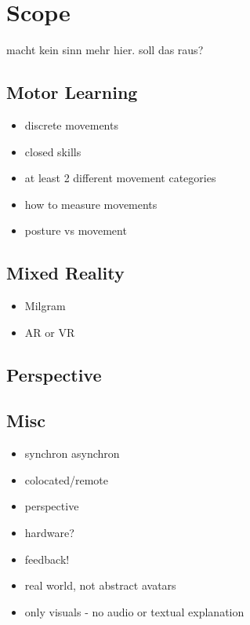 \chapter{Scope}
\todo macht kein sinn mehr hier. soll das raus?
\section{Motor Learning}
\begin{itemize}
	\item discrete movements
	\item closed skills
	\item at least 2 different movement categories
	\item how to measure movements
	\item posture vs movement
\end{itemize}

\section{Mixed Reality}
\begin{itemize}
	\item Milgram
	\item AR or VR
\end{itemize}

\section{Perspective}


\section{Misc}
\begin{itemize}
	\item synchron asynchron
	\item colocated/remote
	\item perspective
	\item hardware?
	\item feedback!
	\item real world, not abstract avatars
	\item only visuals - no audio or textual explanation
\end{itemize}